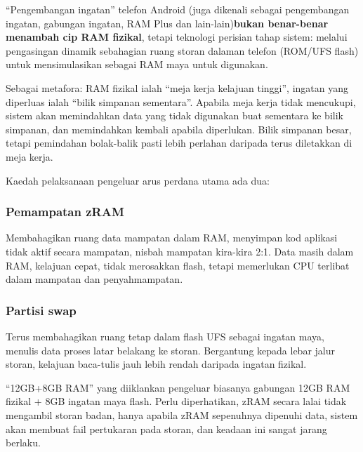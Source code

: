 


“Pengembangan ingatan” telefon Android (juga dikenali sebagai pengembangan ingatan, gabungan ingatan, RAM Plus dan lain-lain)\textbf{bukan benar-benar menambah cip RAM fizikal}, tetapi teknologi perisian tahap sistem: melalui pengasingan dinamik sebahagian ruang storan dalaman telefon (ROM/UFS flash) untuk mensimulasikan sebagai RAM maya untuk digunakan.

Sebagai metafora: RAM fizikal ialah “meja kerja kelajuan tinggi”, ingatan yang diperluas ialah “bilik simpanan sementara”. Apabila meja kerja tidak mencukupi, sistem akan memindahkan data yang tidak digunakan buat sementara ke bilik simpanan, dan memindahkan kembali apabila diperlukan. Bilik simpanan besar, tetapi pemindahan bolak-balik pasti lebih perlahan daripada terus diletakkan di meja kerja.


Kaedah pelaksanaan pengeluar arus perdana utama ada dua:

\subsubsection*{Pemampatan zRAM}

Membahagikan ruang data mampatan dalam RAM, menyimpan kod aplikasi tidak aktif secara mampatan, nisbah mampatan kira-kira 2:1. Data masih dalam RAM, kelajuan cepat, tidak merosakkan flash, tetapi memerlukan CPU terlibat dalam mampatan dan penyahmampatan.

\subsubsection*{Partisi swap}

Terus membahagikan ruang tetap dalam flash UFS sebagai ingatan maya, menulis data proses latar belakang ke storan. Bergantung kepada lebar jalur storan, kelajuan baca-tulis jauh lebih rendah daripada ingatan fizikal.

“12GB+8GB RAM” yang diiklankan pengeluar biasanya gabungan 12GB RAM fizikal + 8GB ingatan maya flash. Perlu diperhatikan, zRAM secara lalai tidak mengambil storan badan, hanya apabila zRAM sepenuhnya dipenuhi data, sistem akan membuat fail pertukaran pada storan, dan keadaan ini sangat jarang berlaku.

